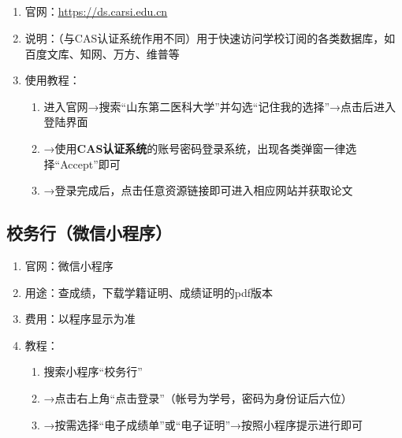 \subsection[CARSI系统]{\textbf{}}
\label{carsi_system}
\begin{enumerate}
    \item 官网：\uline{\href{https://ds.carsi.edu.cn}{https://ds.carsi.edu.cn}}
    \item 说明：（与CAS认证系统作用不同）用于快速访问学校订阅的各类数据库，如百度文库、知网、万方、维普等
    \item 使用教程：
          \begin{enumerate}
              \item 进入官网→搜索“山东第二医科大学”并勾选“记住我的选择”→点击后进入登陆界面\footnotemark
              \item →使用\textbf{CAS认证系统}的账号密码登录系统，出现各类弹窗一律选择“Accept”即可\footnotemark
              \item →登录完成后，点击任意资源链接即可进入相应网站并获取论文
          \end{enumerate}
\end{enumerate}

\subsection[校务行（微信小程序）]{校务行（微信小程序）}
\label{cert_prover}
\begin{enumerate}
    \item 官网：微信小程序
    \item 用途：查成绩，下载学籍证明、成绩证明的pdf版本
    \item 费用：以程序显示为准
    \item 教程：
          \begin{enumerate}
              \item 搜索小程序“校务行”
              \item →点击右上角“点击登录”（帐号为学号，密码为身份证后六位）\footnotemark
              \item →按需选择“电子成绩单”或“电子证明”→按照小程序提示进行即可
          \end{enumerate}
\end{enumerate}


